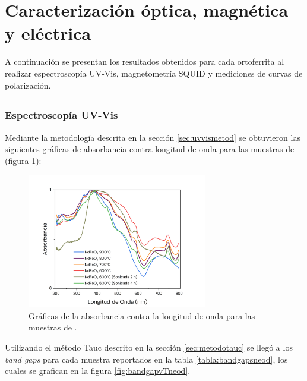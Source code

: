 \documentclass[../main.tex]{subfiles}
\begin{document}
\section{Caracterización óptica, magnética y eléctrica} \label{sec:analisisoptmagelec}
A continuación se presentan los resultados obtenidos para cada ortoferrita al realizar espectroscopía UV-Vis, magnetometría SQUID y mediciones de curvas de polarización.
\subsection{\texorpdfstring{\neod{}}{NdFeO3}}
\subsubsection{Espectroscopía UV-Vis}
Mediante la metodología descrita en la sección \ref{sec:uvvismetod} se obtuvieron las siguientes gráficas de absorbancia contra longitud de onda para las muestras de \neod{} (figura \ref{fig:absorbresneod}):
\begin{figure}[H]
    \centering
    \includegraphics[width=0.7\textwidth]{fig/absorbancianeod.png}
    \caption{Gráficas de la absorbancia contra la longitud de onda para las muestras de \neod{}.}
    \label{fig:absorbresneod}
\end{figure}
Utilizando el método Tauc descrito en la sección \ref{sec:metodotauc} se llegó a los \textit{band gaps} para cada muestra reportados en la tabla \ref{tabla:bandgapsneod}, los cuales se grafican en la figura \ref{fig:bandgapvTneod}.
\end{document}

